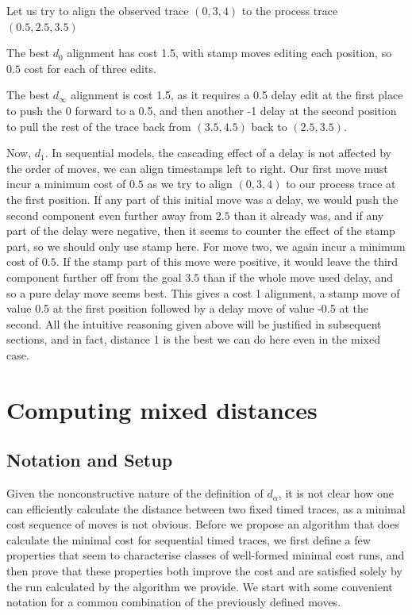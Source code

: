 \documentclass[runningheads]{llncs}
\begin{document}
    \begin{example}\label{stamptoy}
        Let us try to align the observed trace $(0, 3, 4)$ to the process trace $(0.5, 2.5, 3.5)$
        
        The best $d_0$ alignment has cost 1.5, with stamp moves editing each position, so $0.5$ cost for each of three edits. 
        
        The best $d_{\infty}$ alignment is cost 1.5, as it requires a 0.5 delay edit at the first place to push the 0 forward to a 0.5, and then another -1 delay at the second position to pull the rest of the trace back from $(3.5,4.5)$ back to $(2.5,3.5)$. 
        
        Now, $d_1$. 
        In sequential models, the cascading effect of a delay is not affected by the order of moves, we can align timestamps left to right. 
        Our first move must incur a minimum cost of $0.5$ as we try to align $(0,3,4)$ to our process trace at the first position.
        If any part of this initial move was a delay, we would push the second component even further away from $2.5$ than it already was, and if any part of the delay were negative, then it seems to counter the effect of the stamp part, so we should only use stamp here. 
        For move two, we again incur a minimum cost of $0.5$. 
        If the stamp part of this move were positive, it would leave the third component further off from the goal $3.5$ than if the whole move used delay, and so a pure delay move seems best. 
        \color{firstrevision}This gives a cost 1 alignment, a stamp move of value 0.5 at the first position followed by a delay move of \color{secondrevision}value -0.5 at the second.\color{black}
        All the intuitive reasoning given above will be justified in subsequent sections, and in fact, distance 1 is the best we can do here even in the mixed case. 
    \end{example}
    
\section{Computing mixed distances}
\subsection{Notation and Setup}
    Given the nonconstructive nature of the definition of $d_{\alpha}$, it is not clear how one can efficiently calculate the distance between two fixed timed traces, as a minimal cost sequence of moves is not obvious. 
    Before we propose an algorithm that does calculate the minimal cost for sequential timed traces, we first define a few properties that seem to characterise classes of well-formed minimal cost runs, and then prove that these properties both improve the cost and are satisfied solely by the run calculated by the algorithm we provide. 
    We start with some convenient notation for a common combination of the previously defined moves. 
    
\end{document}
